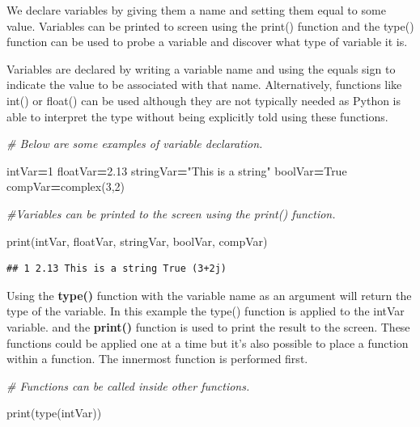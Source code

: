 \documentclass[
]{book}
\newenvironment{Shaded}{\begin{snugshade}}{\end{snugshade}}
\newcommand{\BuiltInTok}[1]{#1}
\newcommand{\CommentTok}[1]{\textcolor[rgb]{0.56,0.35,0.01}{\textit{#1}}}
\newcommand{\DecValTok}[1]{\textcolor[rgb]{0.00,0.00,0.81}{#1}}
\newcommand{\FloatTok}[1]{\textcolor[rgb]{0.00,0.00,0.81}{#1}}
\newcommand{\NormalTok}[1]{#1}
\newcommand{\OperatorTok}[1]{\textcolor[rgb]{0.81,0.36,0.00}{\textbf{#1}}}
\newcommand{\StringTok}[1]{\textcolor[rgb]{0.31,0.60,0.02}{#1}}
\newcommand{\VariableTok}[1]{\textcolor[rgb]{0.00,0.00,0.00}{#1}}
\begin{document}
We declare variables by giving them a name and setting them equal to some value. Variables can be printed to screen using the print() function and the type() function can be used to probe a variable and discover what type of variable it is.

Variables are declared by writing a variable name and using the equals sign to indicate the value to be associated with that name. Alternatively, functions like int() or float() can be used although they are not typically needed as Python is able to interpret the type without being explicitly told using these functions.

\begin{Shaded}
\begin{Highlighting}[]
\CommentTok{\# Below are some examples of variable declaration.}

\NormalTok{intVar}\OperatorTok{=}\DecValTok{1}
\NormalTok{floatVar}\OperatorTok{=}\FloatTok{2.13}
\NormalTok{stringVar}\OperatorTok{=}\StringTok{"This is a string"}
\NormalTok{boolVar}\OperatorTok{=}\VariableTok{True}
\NormalTok{compVar}\OperatorTok{=}\BuiltInTok{complex}\NormalTok{(}\DecValTok{3}\NormalTok{,}\DecValTok{2}\NormalTok{)}

\CommentTok{\#Variables can be printed to the screen using the print() function. }

\BuiltInTok{print}\NormalTok{(intVar, floatVar, stringVar, boolVar, compVar)}
\end{Highlighting}
\end{Shaded}

\begin{verbatim}
## 1 2.13 This is a string True (3+2j)
\end{verbatim}

Using the \textbf{type()} function with the variable name as an argument will return the type of the variable. In this example the type() function is applied to the intVar variable. and the \textbf{print()} function is used to print the result to the screen. These functions could be applied one at a time but it's also possible to place a function within a function. The innermost function is performed first.

\begin{Shaded}
\begin{Highlighting}[]
\CommentTok{\# Functions can be called inside other functions.}

\BuiltInTok{print}\NormalTok{(}\BuiltInTok{type}\NormalTok{(intVar))}
\end{Highlighting}
\end{Shaded}
\end{document}
